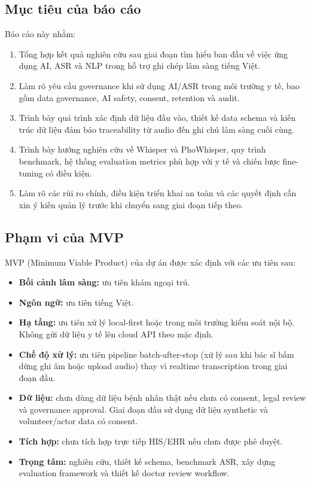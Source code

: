 \documentclass[12pt,a4paper]{article}
\begin{document}
\subsection{Mục tiêu của báo cáo}

Báo cáo này nhằm:

\begin{enumerate}
    \item Tổng hợp kết quả nghiên cứu sau giai đoạn tìm hiểu ban đầu về việc ứng dụng AI, ASR và NLP trong hỗ trợ ghi chép lâm sàng tiếng Việt.
    \item Làm rõ yêu cầu governance khi sử dụng AI/ASR trong môi trường y tế, bao gồm data governance, AI safety, consent, retention và audit.
    \item Trình bày quá trình xác định dữ liệu đầu vào, thiết kế data schema và kiến trúc dữ liệu đảm bảo traceability từ audio đến ghi chú lâm sàng cuối cùng.
    \item Trình bày hướng nghiên cứu về Whisper và PhoWhisper, quy trình benchmark, hệ thống evaluation metrics phù hợp với y tế và chiến lược fine-tuning có điều kiện.
    \item Làm rõ các rủi ro chính, điều kiện triển khai an toàn và các quyết định cần xin ý kiến quản lý trước khi chuyển sang giai đoạn tiếp theo.
\end{enumerate}

\subsection{Phạm vi của MVP}

MVP (Minimum Viable Product) của dự án được xác định với các ưu tiên sau:

\begin{itemize}
    \item \textbf{Bối cảnh lâm sàng:} ưu tiên khám ngoại trú.
    \item \textbf{Ngôn ngữ:} ưu tiên tiếng Việt.
    \item \textbf{Hạ tầng:} ưu tiên xử lý local-first hoặc trong môi trường kiểm soát nội bộ. Không gửi dữ liệu y tế lên cloud API theo mặc định.
    \item \textbf{Chế độ xử lý:} ưu tiên pipeline batch-after-stop (xử lý sau khi bác sĩ bấm dừng ghi âm hoặc upload audio) thay vì realtime transcription trong giai đoạn đầu.
    \item \textbf{Dữ liệu:} chưa dùng dữ liệu bệnh nhân thật nếu chưa có consent, legal review và governance approval. Giai đoạn đầu sử dụng dữ liệu synthetic và volunteer/actor data có consent.
    \item \textbf{Tích hợp:} chưa tích hợp trực tiếp HIS/EHR nếu chưa được phê duyệt.
    \item \textbf{Trọng tâm:} nghiên cứu, thiết kế schema, benchmark ASR, xây dựng evaluation framework và thiết kế doctor review workflow.
\end{itemize}
\end{document}
